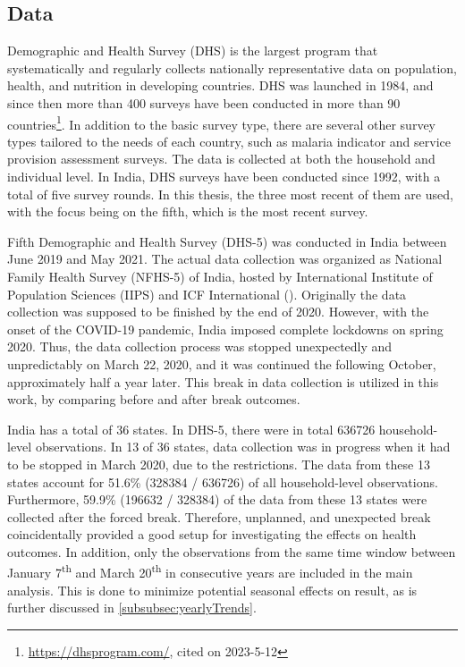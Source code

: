 \documentclass[12pt,a4paper,notitlepage]{article}
\newcommand{\ts}{\textsuperscript}
\begin{document}
\subsection{Data} \label{subsec:data}

Demographic and Health Survey (DHS) is the largest program that systematically and regularly collects nationally representative data on population, health, and nutrition in developing countries. DHS was launched in 1984, and since then more than 400 surveys have been conducted in more than 90 countries\footnote{\url{https://dhsprogram.com/}, cited on 2023-5-12}. In addition to the basic survey type, there are several other survey types tailored to the needs of each country, such as malaria indicator and service provision assessment surveys. The data is collected at both the household and individual level. In India, DHS surveys have been conducted since 1992, with a total of five survey rounds. In this thesis, the three most recent of them are used, with the focus being on the fifth, which is the most recent survey.

Fifth Demographic and Health Survey (DHS-5) was conducted in India between June 2019 and May 2021. The actual data collection was organized as National Family Health Survey (NFHS-5) of India, hosted by International Institute of Population Sciences (IIPS) and ICF International (\citet{iips2021}). Originally the data collection was supposed to be finished by the end of 2020. However, with the onset of the COVID-19 pandemic, India imposed complete lockdowns on spring 2020. Thus, the data collection process was stopped unexpectedly and unpredictably on March 22, 2020, and it was continued the following October, approximately half a year later. This break in data collection is utilized in this work, by comparing before and after break outcomes.

India has a total of 36 states. In DHS-5, there were in total 636726 household-level observations. In 13 of 36 states, data collection was in progress when it had to be stopped in March 2020, due to the restrictions. The data from these 13 states account for 51.6\% (328384 / 636726) of all household-level observations. Furthermore, 59.9\% (196632 / 328384) of the data from these 13 states were collected after the forced break. Therefore, unplanned, and unexpected break coincidentally provided a good setup for investigating the effects on health outcomes. In addition, only the observations from the same time window between January 7\ts{th} and March 20\ts{th} in consecutive years are included in the main analysis. This is done to minimize potential seasonal effects on result, as is further discussed in \cref{subsubsec:yearlyTrends}.
\end{document}
